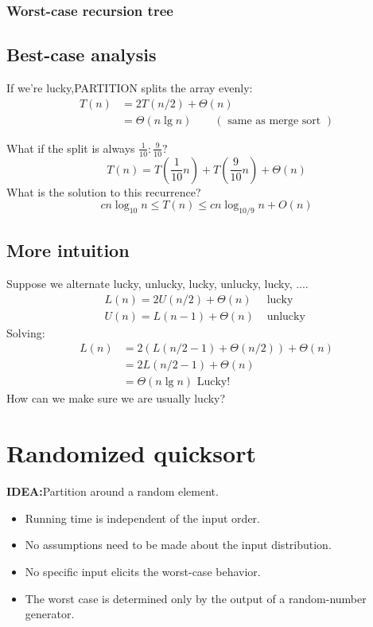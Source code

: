 \documentclass[11pt,toc=twocol]{elegantbook}
\begin{document}
\subsubsection{Worst-case recursion tree}
\subsection{Best-case analysis}
If we're lucky,PARTITION splits the array evenly:
$$
\begin{aligned}
T(n) &=2 T(n / 2)+\Theta(n) \\
&=\Theta(n \lg n) \quad \quad(\text { same as merge sort })
\end{aligned}
$$

What if the split is always $\frac{1}{10}: \frac{9}{10} ?$
$$
T(n)=T\left(\frac{1}{10} n\right)+T\left(\frac{9}{10} n\right)+\Theta(n)
$$
What is the solution to this recurrence?
$$
c n \log _{10} n \leq T(n) \leq c n \log _{10 / 9} n+O(n)
$$
\subsection{More intuition}
Suppose we alternate lucky, unlucky, lucky, unlucky, lucky, ....
$$
\begin{array}{ll}
L(n)=2 U(n / 2)+\Theta(n) & \text { lucky } \\
U(n)=L(n-1)+\Theta(n) & \text { unlucky }
\end{array}
$$
Solving:
$$
\begin{aligned}
L(n) &=2(L(n / 2-1)+\Theta(n / 2))+\Theta(n) \\
&=2 L(n / 2-1)+\Theta(n) \\
&=\Theta(n \lg n) \text { Lucky! }
\end{aligned}
$$
How can we make sure we are usually lucky?
\section{Randomized quicksort}
    \begin{note}
        \textbf{IDEA:}Partition around a random element.
        \begin{itemize}
            \item Running time is independent of the input order.
            \item No assumptions need to be made about the input distribution.
            \item No specific input elicits the worst-case behavior.
            \item The worst case is determined only by the output of a random-number generator.
        \end{itemize}
    \end{note}
\end{document}
